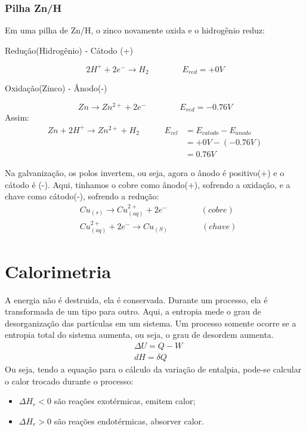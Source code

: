 \documentclass{article}
\begin{document}
\subsubsection{Pilha Zn/H}
Em uma pilha de Zn/H, o zinco novamente oxida e o hidrogênio reduz:
\begin{center}
  Redução(Hidrogênio) - Cátodo (+)
\end{center}
\begin{equation}
  2H^{+}+2e^-\rightarrow H_2  \quad\quad\quad\quad E_{red}=+0V
\end{equation}
\begin{center}
  Oxidação(Zinco) - Ânodo(-)
\end{center}
\begin{equation}
  Zn \rightarrow Zn^{2+}+2e^- \quad\quad\quad\quad E_{red}=-0.76V
\end{equation}
Assim:
\begin{align*}
  Zn+2H^{+}\rightarrow Zn^{2+}+H_2 \quad\quad\quad E_{cel}&=E_{catodo}-E_{anodo}\\
&=+0V-(-0.76V)\\
&=0.76V
\end{align*}

Na galvanização, os polos invertem, ou seja, agora o ânodo é positivo(+) e o cátodo é (-). Aqui, tinhamos o cobre como ânodo(+), sofrendo a oxidação, e a chave como cátodo(-), sofrendo a redução:
\begin{align*}
  &Cu_{(s)} \rightarrow Cu^{2+}_{(aq)} + 2e^- \quad\quad\quad\quad (cobre)\\
  &Cu^{2+}_{(aq)}+2e^-\rightarrow Cu_{(S)} \quad\quad\quad\quad (chave)
\end{align*}

\section{Calorimetria}
A energia não é destruida, ela é conservada. Durante um processo, ela é transformada de um tipo para outro. Aqui, a entropia mede o grau de desorganização das partículas em um sistema. Um processo somente ocorre se a entropia total do sistema aumenta, ou seja, o grau de desordem aumenta.
\begin{align*}
  &\Delta U=Q-W\\
  &dH=\delta Q
\end{align*}
Ou seja, tendo a equação para o cálculo da variação de entalpia, pode-se calcular o calor trocado durante o processo:
\begin{itemize}
  \item $\Delta H_r < 0$ são reações exotérmicas, emitem calor;
  \item $\Delta H_r > 0$ são reações endotérmicas, absorver calor.
\end{itemize}
\end{document}
